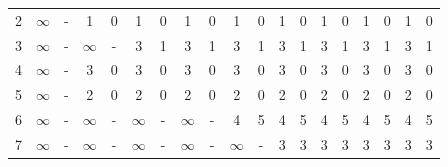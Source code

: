 \documentclass[12pt, a4paper]{report}
\begin{document}
\begin{table}[H]
{\begin{tabular}{|c|cc|cc|cc|cc|cc|cc|cc|cc|cc|}
            2                              & $\infty$              & -                     & 1                     & 0                     & 1                     & 0                     & 1                     & 0                     & 1                     & 0                     & 1                     & 0                     & 1                     & 0                     & 1                     & 0                     & 1                     & 0                    \\
            3                              & $\infty$              & -                     & $\infty$              & -                     & 3                     & 1                     & 3                     & 1                     & 3                     & 1                     & 3                     & 1                     & 3                     & 1                     & 3                     & 1                     & 3                     & 1                    \\
            4                              & $\infty$              & -                     & 3                     & 0                     & 3                     & 0                     & 3                     & 0                     & 3                     & 0                     & 3                     & 0                     & 3                     & 0                     & 3                     & 0                     & 3                     & 0                    \\
            5                              & $\infty$              & -                     & 2                     & 0                     & 2                     & 0                     & 2                     & 0                     & 2                     & 0                     & 2                     & 0                     & 2                     & 0                     & 2                     & 0                     & 2                     & 0                    \\
            6                              & $\infty$              & -                     & $\infty$              & -                     & $\infty$              & -                     & $\infty$              & -                     & 4                     & 5                     & 4                     & 5                     & 4                     & 5                     & 4                     & 5                     & 4                     & 5                    \\
            7                              & $\infty$              & -                     & $\infty$              & -                     & $\infty$              & -                     & $\infty$              & -                     & $\infty$              & -                     & 3                     & 3                     & 3                     & 3                     & 3                     & 3                     & 3                     & 3                    \\ \hline
            \end{tabular}%
            }
        \end{table}
\end{document}
